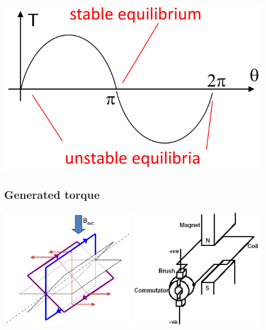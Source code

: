 \documentclass[11pt]{article}
\begin{document}
\begin{center}
\includegraphics[width=.9\linewidth]{./images/dc-motor-without-commutation-graph.png}
\end{center}
\subsection{Generated torque}
\label{sec:org8cdd916}
\begin{center}
\includegraphics[width=0.49\textwidth]{./images/dc-motor-rotation-diagram.png}
\includegraphics[width=0.49\textwidth]{./images/dc-motor-components.png}
\end{center}
\end{document}
